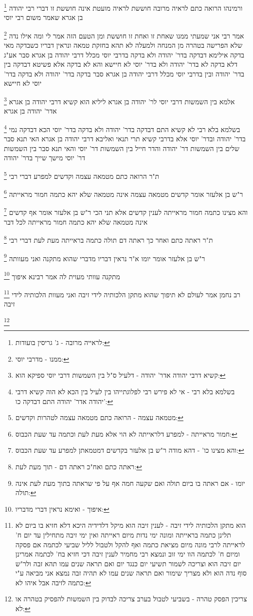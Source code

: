 \documentclass[12pt, openany]{book}
\newcommand{\footnotecomment}[1]{
	\renewcommand\thefootnote{}
	\footnote{#1}}
\newcommand{\commenta}[1]{\footnotecomment{#1}}
\begin{document}
{\commenta{לראייה מרובה - ג' גריסין בועודות:}
ורמינהו הרואה כתם לראיה מרובה חוששת לראיה מועטת אינה חוששת זו דברי רבי יהודה בן אגרא שאמר משום רבי יוסי 
\commenta{ממנו - מדרבי יוסי:}
אמר רבי אני שמעתי ממנו שאחת זו ואחת זו חוששת ומן הטעם הזה אמר לי ומה אילו נדה שלא הפרישה בטהרה מן המנחה ולמעלה לא תהא בחזקת טמאה ונראין דבריו כשבדקה 
מאי בדקה אילימא דבדקה בדר' יהודה ולא בדקה בדרבי יוסי מכלל דרבי יהודה בן אגרא סבר אע"ג דלא בדקה לא בדר' יהודה ולא בדר' יוסי לא חיישא והא לא בדקה 
אלא פשיטא דבדקה בין בדר' יהודה ובין בדרבי יוסי מכלל דרבי יהודה בן אגרא סבר בדקה בדר' יהודה ולא בדקה בדר' יוסי לא חיישא
\commenta{קשיא דרבי יהודה אדר' יהודה - דלעיל ס"ל בין השמשות דרבי יוסי ספיקא הוא:}
אלמא בין השמשות דרבי יוסי לר' יהודה בן אגרא ליליא הוא קשיא דרבי יהודה בן אגרא אדר' יהודה בן אגרא 
\commenta{בשלמא בלא רבי - אי לא פירש רבי לפלוגתייהו בין לעיל בין הכא לא הוה קשיא דרבי יהודה אדר' יהודה התם דבדקה כו':}
בשלמא בלא רבי לא קשיא התם דבדקה בדר' יהודה ולא בדקה בדר' יוסי הכא דבדקה נמי בדר' יהודה ובדר' יוסי אלא בדרבי קשיא 
תרי תנאי ואליבא דרבי יהודה בן אגרא האי תנא סבר שלים בין השמשות דר' יהודה
והדר חייל בין השמשות דר' יוסי והאי תנא סבר בין השמשות דר' יוסי מישך שייך בדר' יהודה 
\commenta{מטמאה עצמה - הרואה כתם מטמאה עצמה לטהרות וקדשים:}
ת"ר הרואה כתם מטמאה עצמה וקדשים למפרע דברי רבי 
\commenta{חמור מראייתה - למפרע דלראייתה לא הוי אלא מעת לעת וכתמה עד שעת הכבוס:}
ר"ש בן אלעזר אומר קדשים מטמאה עצמה אינה מטמאה שלא יהא כתמה חמור מראייתה 
\commenta{והא מצינו כו' - דהא מודה ר"ש בן אלעזר בקדשים דמטמאתן למפרע עד שעת הכבוס:}
והא מצינו כתמה חמור מראייתה לענין קדשים 
אלא תני הכי ר"ש בן אלעזר אומר אף קדשים אינה מטמאה שלא יהא כתמה חמור מראייתה לכל דבר 
\commenta{ראתה כתם ואח"כ ראתה דם - תוך מעת לעת:}
ת"ר ראתה כתם ואחר כך ראתה דם תולה כתמה בראייתה מעת לעת דברי רבי 
\commenta{יומו - אם ראתה בו ביום תולה ואם שקעה חמה אף על פי שראתה בתוך מעת לעת אינה תולה:}
ר"ש בן אלעזר אומר יומו א"ר נראין דבריו מדברי שהוא מתקנה ואני מעוותה 
\commenta{איפוך - ואימא נראין דברי מדבריו:}
מתקנה עוותי מעוית לה אמר רבינא איפוך 
\commenta{הוא מתקן הלכותיה לידי זיבה - לענין זיבה הוא מיקל דלדידיה היכא דלא חזיא בו ביום לא תלינן כתמה בראייתה ומונה ימי נדות מיום ראייתה ואין ימי זיבה מתחילין עד יום ח' לראייתה לרבי מונה מיום מציאת כתמה ואף להקל ולטבול לליל שביעי לכתמה אם פסקה ומיום ח' לכתמה הוו ימי זוב ונמצא רבי מחמיר לענין זיבה דכי חזיא בח' לכתמה אמרינן יום זיבה הוא וצריכה לשמור תשיעי יום כנגד יום ואם תראה שנים עמו תהא זבה ולר"ש סוף נדה הוא ולא מצריך שימור ואם תראה שנים עמו לא תהיה זבה נמצא אני מביאה ע"י כתמה לזיבה אבל איהו לא:}
רב נחמן אמר לעולם לא תיפוך שהוא מתקן הלכותיה לידי זיבה
ואני מעוות הלכותיה לידי זיבה 
\commenta{צריכין הפסק טהרה - בשביעי לטבול בערב צריכה לבדוק בין השמשות להפסיק בטהרה או לא:}
}
\end{document}
